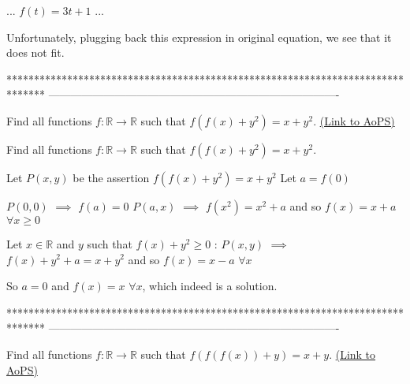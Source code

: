 \begin{solution}
	\begin{tcolorbox}...
$f(t)=3t+1$
...\end{tcolorbox}
Unfortunately, plugging back this expression in original equation, we see that it does not fit.
\end{solution}
*******************************************************************************
-------------------------------------------------------------------------------

\begin{problem}
	Find all  functions $f: \mathbb{R}\to\mathbb{R}$ such that $f(f(x)+y^2)=x+y^2$.
	\flushright \href{https://artofproblemsolving.com/community/c6h561100}{(Link to AoPS)}
\end{problem}



\begin{solution}
	\begin{tcolorbox}Find all  functions $f: \mathbb{R}\to\mathbb{R}$ such that $f(f(x)+y^2)=x+y^2$.\end{tcolorbox}
Let $P(x,y)$ be the assertion $f(f(x)+y^2)=x+y^2$
Let $a=f(0)$

$P(0,0)$ $\implies$ $f(a)=0$
$P(a,x)$ $\implies$ $f(x^2)=x^2+a$ and so $f(x)=x+a$ $\forall x\ge 0$

Let $x\in \mathbb R$ and $y$ such that $f(x)+y^2\ge 0$ : $P(x,y)$ $\implies$ $f(x)+y^2+a=x+y^2$ and so $f(x)=x-a$ $\forall x$

So $a=0$ and $\boxed{f(x)=x}$ $\forall x$, which indeed is a solution.
\end{solution}
*******************************************************************************
-------------------------------------------------------------------------------

\begin{problem}
	Find all  functions $f: \mathbb{R}\to\mathbb{R}$ such that $f(f(f(x))+y)=x+y$.
	\flushright \href{https://artofproblemsolving.com/community/c6h561101}{(Link to AoPS)}
\end{problem}



